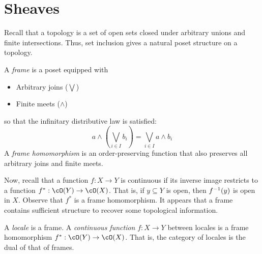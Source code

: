 \documentclass[article,10pt,oneside]{memoir}
\begin{document}
\section{Sheaves}
\label{sec:sheaves}

Recall that a topology is a set of open sets closed under arbitrary unions and finite intersections.
Thus, set inclusion gives a natural poset structure on a topology.

\begin{defn}
  A \emph{frame} is a poset equipped with
  \begin{itemize}
  \item Arbitrary joins ($\bigvee$)
  \item Finite meets ($\wedge$)
  \end{itemize}
  so that the infinitary distributive law is satisfied:
  \[
    a \wedge \left(\bigvee_{i \in I}b_{i}\right) = \bigvee_{i \in I}a \wedge b_{i}
  \]
  A \emph{frame homomorphism} is an order-preserving function that also preserves all arbitrary joins and finite meets.
\end{defn}

Now, recall that a function $f : X \to Y$ is continuous if its inverse image restricts to a function $f^{*} : \cO(Y) \to \cO(X)$.
That is, if $y \subseteq Y$ is open, then $f^{-1}(y)$ is open in $X$.
Observe that $f^{*}$ is a frame homomorphism.
It appears that a frame contains sufficient structure to recover some topological information.

\begin{defn}
  A \emph{locale} is a frame.
  A \emph{continuous function} $f : X \to Y$ between locales is a frame homomorphism $f^{*} : \cO(Y) \to \cO(X)$.
  That is, the category of locales is the dual of that of frames.
\end{defn}
\end{document}
